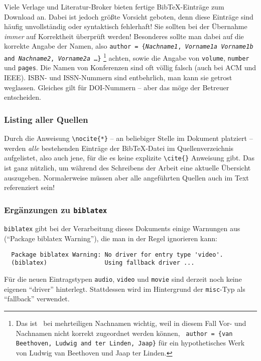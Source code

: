Viele Verlage und Literatur-Broker bieten fertige BibTeX-Einträge zum Download an.
Dabei ist jedoch größte Vorsicht geboten, denn diese Einträge sind häufig
unvollständig oder syntaktisch fehlerhaft!
Sie sollten bei der Übernahme \emph{immer} auf Korrektheit überprüft werden!
Besonderes sollte man dabei auf die korrekte Angabe der Namen, also 
\texttt{author = \{\textit{Nachname1}, \textit{Vorname1a} \emph{Vorname1b} 
and \textit{Nachname2}, \textit{Vorname2a} \ldots \}}%
\footnote{Das ist \va\ bei mehrteiligen Nachnamen wichtig, weil in diesem Fall
Vor- und Nachnamen nicht korrekt zugeordnet werden können, \zB\ 
\texttt{author = \{van Beethoven, Ludwig and ter Linden, Jaap\}}
für ein hypothetisches Werk von Ludwig van Beethoven und Jaap ter Linden.}
achten, sowie die Angabe von \texttt{volume}, \texttt{number} und \texttt{pages}.
Die Namen von Konferenzen sind oft völlig falsch (auch bei ACM und IEEE).
ISBN- und ISSN-Nummern sind entbehrlich, man kann sie getrost weglassen.
Gleiches gilt für DOI-Nummern -- aber das möge der Betreuer entscheiden.
 

\subsubsection{Listing aller Quellen}

Durch die Anweisung \verb!\nocite{*}! -- an beliebiger Stelle im Dokument platziert -- werden \emph{alle} bestehenden Einträge der BibTeX-Datei im Quellenverzeichnis aufgelistet, also auch jene, für die es keine explizite \verb!\cite{}! Anweisung gibt. Das ist ganz nützlich, um während des Schreibens der Arbeit eine aktuelle Übersicht auszugeben. Normalerweise müssen aber alle angeführten Quellen auch im Text referenziert sein!


\subsubsection{Ergänzungen zu \texttt{biblatex}}

\texttt{biblatex} gibt bei der Verarbeitung dieses Dokuments einige Warnungen aus ("`Package biblatex Warning"'), 
die man in der Regel ignorieren kann:
\begin{small}
\begin{verbatim}
  Package biblatex Warning: No driver for entry type 'video'.
  (biblatex)                Using fallback driver ...
\end{verbatim}
\end{small}
Für die neuen Eintragstypen \texttt{audio}, \texttt{video} und \texttt{movie} sind derzeit 
noch keine eigenen "`driver"' hinterlegt. Stattdessen wird im Hintergrund der \texttt{misc}-Typ 
als "`fallback"' verwendet.

